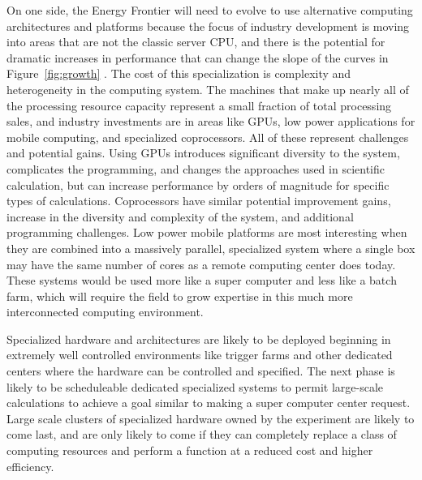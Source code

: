 On one side, the Energy Frontier will need to evolve to use alternative
computing architectures and platforms because the focus of industry
development is moving into areas that are not the classic server CPU,
and there is the potential for dramatic increases in performance that
can change the slope of the curves in Figure~\ref{fig:growth} .  The
cost of this specialization is complexity and heterogeneity in the
computing system.  The machines that make up nearly all of the
processing resource capacity represent a small fraction of total
processing sales, and industry investments are in areas like GPUs, low
power applications for mobile computing, and specialized coprocessors.
All of these represent challenges and potential gains.  Using GPUs
introduces significant diversity to the system, complicates the
programming, and changes the approaches used in scientific
calculation, but can increase performance by orders of magnitude for
specific types of calculations.  Coprocessors have similar potential
improvement gains, increase in the diversity and complexity of the
system, and additional programming challenges.  Low power mobile
platforms are most interesting when they are combined into a massively
parallel, specialized system where a single box may have the same
number of cores as a remote computing center does today.  These
systems would be used more like a super computer and less like a batch
farm, which will require the field to grow expertise in this much more
interconnected computing environment.


Specialized hardware and architectures are likely to be deployed beginning
in extremely well controlled environments like trigger farms and other
dedicated centers where the hardware can be controlled and specified.
The next phase is likely to be scheduleable dedicated specialized
systems to permit large-scale calculations to achieve a goal similar
to making a super computer center request.  Large scale clusters of
specialized hardware owned by the experiment are likely to come last,
and are only likely to come if they can completely replace a class of
computing resources and perform a function at a reduced cost and
higher efficiency.

